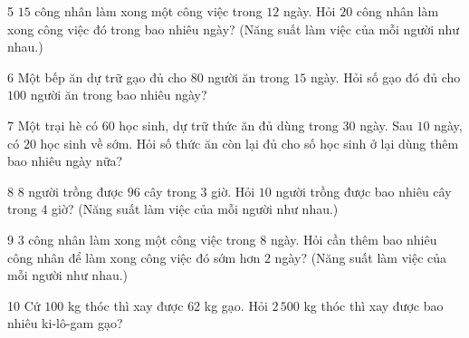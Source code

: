 \gap
\begin{probbox}{5}{\relax}
$15$ công nhân làm xong một công việc trong $12$ ngày. Hỏi $20$ công nhân làm xong công việc đó trong bao nhiêu ngày? (Năng suất làm việc của mỗi người như nhau.)
\end{probbox}
\gap
\begin{probbox}{6}{\relax}
Một bếp ăn dự trữ gạo đủ cho $80$ người ăn trong $15$ ngày. Hỏi số gạo đó đủ cho $100$ người ăn trong bao nhiêu ngày?
\end{probbox}
\gap
\begin{probbox}{7}{\relax}
Một trại hè có $60$ học sinh, dự trữ thức ăn đủ dùng trong $30$ ngày. Sau $10$ ngày, có $20$ học sinh về sớm. Hỏi số thức ăn còn lại đủ cho số học sinh ở lại dùng thêm bao nhiêu ngày nữa?
\end{probbox}
\gap
\begin{probbox}{8}{\relax}
$8$ người trồng được $96$ cây trong $3$ giờ. Hỏi $10$ người trồng được bao nhiêu cây trong $4$ giờ? (Năng suất làm việc của mỗi người như nhau.)
\end{probbox}
\gap
\begin{probbox}{9}{\relax}
$3$ công nhân làm xong một công việc trong $8$ ngày. Hỏi cần thêm bao nhiêu công nhân để làm xong công việc đó sớm hơn $2$ ngày? (Năng suất làm việc của mỗi người như nhau.)
\end{probbox}
\gap
\begin{probbox}{10}{\relax}
Cứ $100$ kg thóc thì xay được $62$ kg gạo. Hỏi $2\,500$ kg thóc thì xay được bao nhiêu ki-lô-gam gạo?
\end{probbox}
